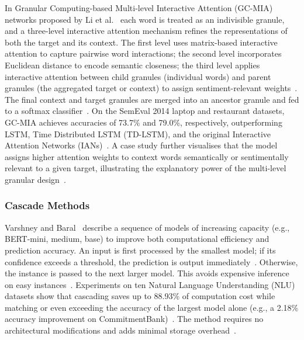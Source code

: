 \documentclass[a4paper,twoside,12pt]{book}
\begin{document}
In Granular Computing-based Multi-level Interactive Attention (GC-MIA) networks proposed by Li et al.~\cite{Li2020GrC} each word is treated as an indivisible granule, and a three-level interactive attention mechanism refines the representations of both the target and its context. The first level uses matrix-based interactive attention to capture pairwise word interactions; the second level incorporates Euclidean distance to encode semantic closeness; the third level applies interactive attention between child granules (individual words) and parent granules (the aggregated target or context) to assign sentiment-relevant weights~\cite{Li2020GrC}. The final context and target granules are merged into an ancestor granule and fed to a softmax classifier~\cite{Li2020GrC}. On the SemEval 2014 laptop and restaurant datasets, GC-MIA achieves accuracies of 73.7\% and 79.0\%, respectively, outperforming LSTM, Time Distributed LSTM (TD-LSTM), and the original Interactive Attention Networks (IANs)~\cite{Li2020GrC}. A case study further visualises that the model assigns higher attention weights to context words semantically or sentimentally relevant to a given target, illustrating the explanatory power of the multi-level granular design~\cite{Li2020GrC}.

\subsubsection{Cascade Methods}

Varshney and Baral~\cite{varshney2022model} describe a sequence of models of increasing capacity (e.g., BERT-mini, medium, base) to improve both computational efficiency and prediction accuracy. An input is first processed by the smallest model; if its confidence exceeds a threshold, the prediction is output immediately~\cite{varshney2022model}. Otherwise, the instance is passed to the next larger model. This avoids expensive inference on easy instances~\cite{varshney2022model}. Experiments on ten Natural Language Understanding (NLU) datasets show that cascading saves up to 88.93\% of computation cost while matching or even exceeding the accuracy of the largest model alone (e.g., a 2.18\% accuracy improvement on CommitmentBank)~\cite{varshney2022model}. The method requires no architectural modifications and adds minimal storage overhead~\cite{varshney2022model}.
\end{document}
